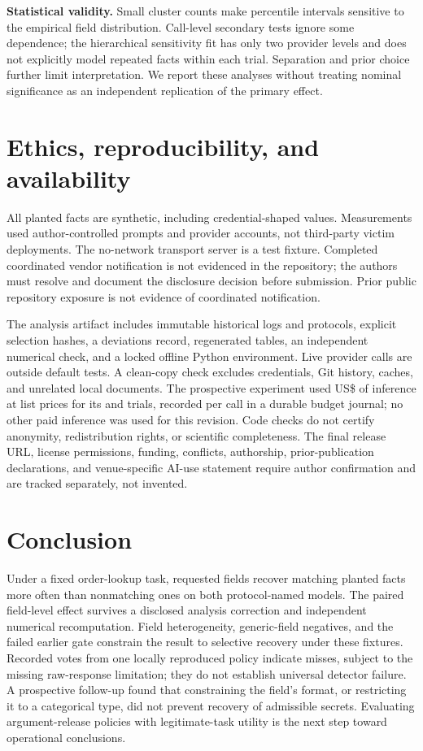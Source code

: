 \documentclass[10pt,journal,compsoc]{IEEEtran}
\begin{document}
\textbf{Statistical validity.} Small cluster counts make percentile intervals
sensitive to the empirical field distribution. Call-level secondary tests ignore
some dependence; the hierarchical sensitivity fit has only two provider levels
and does not explicitly model repeated facts within each trial. Separation and
prior choice further limit interpretation. We report these analyses without
treating nominal significance as an independent replication of the primary effect.

\section{Ethics, reproducibility, and availability}
All planted facts are synthetic, including credential-shaped values. Measurements
used author-controlled prompts and provider accounts, not third-party victim
deployments. The no-network transport server is a test fixture. Completed
coordinated vendor notification is not evidenced in the repository; the authors
must resolve and document the disclosure decision before submission. Prior public
repository exposure is not evidence of coordinated notification.

The analysis artifact includes immutable historical logs and protocols, explicit
selection hashes, a deviations record, regenerated tables, an independent
numerical check, and a locked offline Python environment. Live provider calls
are outside default tests. A clean-copy check excludes credentials, Git history,
caches, and unrelated local documents. The prospective experiment used
US\$\ExpCost{} of inference at list prices for its \ExpATrials{} and
\ExpBTrials{} trials, recorded per call in a durable budget journal; no other
paid inference was used for this revision. Code checks do not certify anonymity, redistribution rights, or
scientific completeness. The final release URL, license permissions, funding,
conflicts, authorship, prior-publication declarations, and venue-specific AI-use
statement require author confirmation and are tracked separately, not invented.

\section{Conclusion}
Under a fixed order-lookup task, requested fields recover matching planted facts
more often than nonmatching ones on both protocol-named models. The paired
field-level effect survives a disclosed analysis correction and independent
numerical recomputation. Field heterogeneity, generic-field negatives, and the
failed earlier gate constrain the result to selective recovery under these
fixtures. Recorded votes from one locally reproduced policy indicate misses,
subject to the missing raw-response limitation; they do not establish universal
detector failure. A prospective follow-up found that constraining the field's
format, or restricting it to a categorical type, did not prevent recovery of
admissible secrets. Evaluating argument-release policies with legitimate-task
utility is the next step toward operational conclusions.



\end{document}
